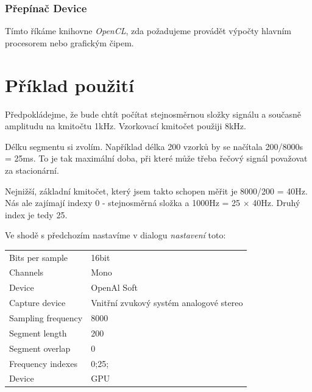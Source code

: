 \subsubsection{Přepínač Device}

Tímto říkáme knihovne \emph{OpenCL}, zda požadujeme provádět výpočty hlavním procesorem nebo grafickým čipem.

\section{Příklad použití}

Předpokládejme, že bude chtít počítat stejnosměrnou složky signálu a současně amplitudu na kmitočtu 1kHz. Vzorkovací kmitočet použiji 8kHz.

Délku segmentu si zvolím. Například délka 200 vzorků by se načítala 200/8000s = 25ms. To je tak maximální doba, při které může třeba řečový signál považovat za stacionární.

Nejnižší, základní kmitočet, který jsem takto schopen měřit je 8000/200 = 40Hz. Nás ale zajímají indexy 0 - stejnosměrná složka a 1000Hz = 25 $\times$ 40Hz. Druhý index je tedy 25.

Ve shodě s předchozím nastavíme v dialogu \emph{nastavení} toto:\\

\begin{tabular}{|l|l|}
\hline
Bits per sample&16bit\\
Channels&Mono\\
Device&OpenAl Soft\\
Capture device&Vnitřní zvukový systém analogové stereo\\
Sampling frequency&8000\\
Segment length&200\\
Segment overlap&0\\
Frequency indexes&0;25;\\
Device&GPU\\
\hline 
\end{tabular}



